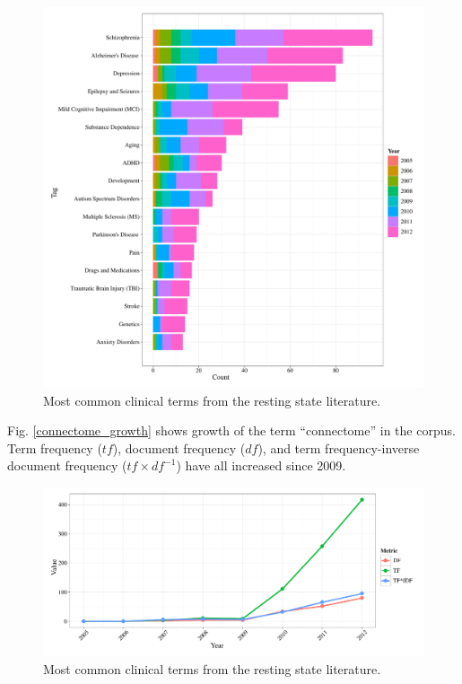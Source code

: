 \documentclass[5p]{elsarticle}
\begin{document}
\begin{figure}
  \begin{center}
    \includegraphics[width=\linewidth]{figures/clinical_bytag_hist}%
    \caption{Most common clinical terms from the resting state literature.
        \label{fig:clinical_bytag_hist}
    }
  \end{center}
\end{figure}

Fig. \ref{connectome_growth} shows growth of the term ``connectome'' in the corpus. Term frequency
($t\!f$), document frequency ($d\!f$), and term frequency-inverse document frequency
($t\!f \times d\!f^{-1}$) have all increased since 2009.  

\begin{figure}
  \begin{center}
    \includegraphics[width=\linewidth]{figures/connectome_growth}%
    \caption{Most common clinical terms from the resting state literature.
        \label{fig:connectome_growth}
    }
  \end{center}
\end{figure}
\end{document}
